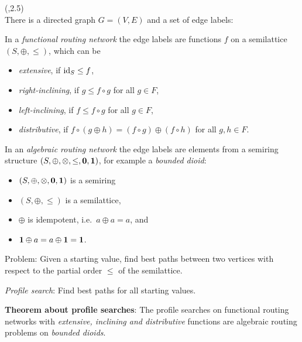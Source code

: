\begin{textblock}{\mycolwidth}(\rightpos,2.5)
 \\
\large
There is a directed graph $G = (V, E)$ and a set of edge labels:
\begin{multicols}{2}
\normalsize
In a \emph{functional routing network} the edge labels are
functions $f$ on a semilattice $(S, \oplus, \leq)$, which can be
\begin{itemize}[itemindent=1cm,labelsep=0.5cm]
  \item \emph{extensive}, if $\text{id}_S \leq f$,
  \item \emph{right-inclining}, if $g \leq f \circ g$ for all $g \in F$,
  \item \emph{left-inclining}, if $f \leq f \circ g$ for all $g \in F$,
  \item \emph{distributive}, if $f \circ (g \oplus h) = (f \circ g) \oplus (f \circ h)$
  for all $g, h \in F$.
\end{itemize}
In an \emph{algebraic routing network} the edge labels are elements from a semiring structure $(S, \oplus, \otimes, \leq, \textbf{0}, \textbf{1})$, for example a \emph{bounded dioid}:
\begin{itemize}[itemindent=1cm,labelsep=0.5cm]
  \item $(S, \oplus, \otimes, \textbf{0}, \textbf{1})$ is a semiring
  \item $(S, \oplus, \leq)$ is a semilattice,
  \item $\oplus$ is idempotent, i.e.\ $a \oplus a = a$, and
  \item $\textbf{1} \oplus a = a \oplus \textbf{1} = \textbf{1}$.
\end{itemize}
\end{multicols}
Problem: Given a starting value, find best paths between two vertices with respect to the partial order $\leq$ of the semilattice.

\emph{Profile search}: Find best paths for all starting values.

\textbf{Theorem about profile searches}:
The profile searches on functional routing networks with
\emph{extensive, inclining and distributive}
functions are algebraic routing problems on \emph{bounded dioids}.
\end{textblock}

